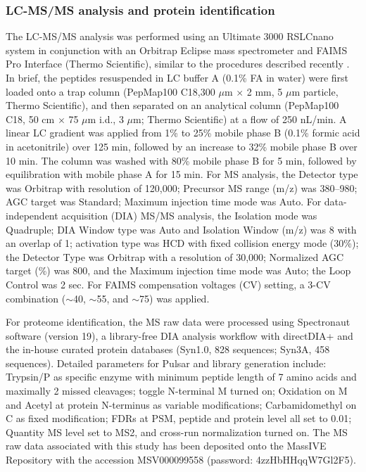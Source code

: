 \subsubsection{LC-MS/MS analysis and protein identification}
The LC-MS/MS analysis was performed using an Ultimate 3000 RSLCnano system in conjunction with an Orbitrap Eclipse mass spectrometer and FAIMS Pro Interface (Thermo Scientific), similar to the procedures described recently \citep{sun_-cell_2026}. In brief, the peptides resuspended in LC buffer A (0.1\% FA in water) were first loaded onto a trap column (PepMap100 C18,300 $\mu$m $\times$ 2 mm, 5 $\mu$m particle, Thermo Scientific), and then separated on an analytical column (PepMap100 C18, 50 cm $\times$ 75 $\mu$m i.d., 3 $\mu$m; Thermo Scientific) at a flow of 250 nL/min. A linear LC gradient was applied from 1\% to 25\% mobile phase B (0.1\% formic acid in acetonitrile) over 125 min, followed by an increase to 32\% mobile phase B over 10 min. The column was washed with 80\% mobile phase B for 5 min, followed by equilibration with mobile phase A for 15 min. For MS analysis, the Detector type was Orbitrap with resolution of 120,000; Precursor MS range (m/z) was 380–980; AGC target was Standard; Maximum injection time mode was Auto. For data-independent acquisition (DIA) MS/MS analysis, the Isolation mode was Quadruple; DIA Window type was Auto and Isolation Window (m/z) was 8 with an overlap of 1; activation type was HCD with fixed collision energy mode (30\%); the Detector Type was Orbitrap with a resolution of 30,000; Normalized AGC target (\%) was 800, and the Maximum injection time mode was Auto; the Loop Control was 2 sec. For FAIMS compensation voltages (CV) setting, a 3-CV combination ($\sim$40, $\sim$55, and $\sim$75) was applied.

For proteome identification, the MS raw data were processed using Spectronaut software (version 19), a library-free DIA analysis workflow with directDIA+ and the in-house curated protein databases (Syn1.0, 828 sequences; Syn3A, 458 sequences). Detailed parameters for Pulsar and library generation include: Trypsin/P as specific enzyme with minimum peptide length of 7 amino acids and maximally 2 missed cleavages; toggle N-terminal M turned on; Oxidation on M and Acetyl at protein N-terminus as variable modifications; Carbamidomethyl on C as fixed modification; FDRs at PSM, peptide and protein level all set to 0.01; Quantity MS level set to MS2, and cross-run normalization turned on. The MS raw data associated with this study has been deposited onto the MassIVE Repository with the accession MSV000099558 (password: 4zzHbHHqqW7Gl2F5).

